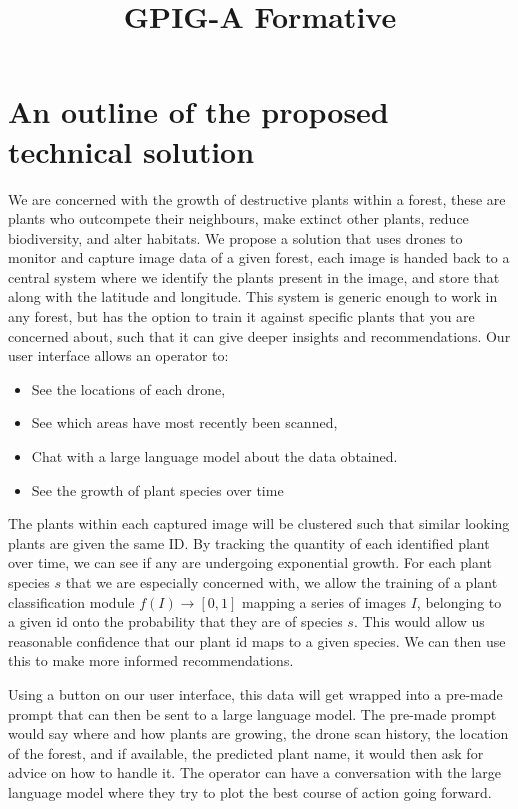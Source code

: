 \documentclass{article}
\title{GPIG-A Formative}
\begin{document}
\maketitle

\section{An outline of the proposed technical solution}

We are concerned with the growth of destructive plants within a forest, these are plants who outcompete their neighbours, make extinct other plants, reduce biodiversity, and alter habitats. 
We propose a solution that uses drones to monitor and capture image data of a given forest, each image is handed back to a central system where we identify the plants present in the image, and store that along with the latitude and longitude.
This system is generic enough to work in any forest, but has the option to train it against specific plants that you are concerned about, such that it can give deeper insights and recommendations.
Our user interface allows an operator to:
\begin{itemize}[noitemsep,topsep=3pt]
\item See the locations of each drone,
\item See which areas have most recently been scanned,
\item Chat with a large language model about the data obtained.
\item See the growth of plant species over time
\end{itemize}


The plants within each captured image will be clustered such that similar looking plants are given the same ID. 
By tracking the quantity of each identified plant over time, we can see if any are undergoing exponential growth.
For each plant species $s$ that we are especially concerned with, we allow the training of a plant classification module $f(I) \rightarrow [0,1]$ mapping a series of images $I$, belonging to a given id onto the probability that they are of species $s$. 
This would allow us reasonable confidence that our plant id maps to a given species.
We can then use this to make more informed recommendations.

Using a button on our user interface, this data will get wrapped into a pre-made prompt that can then be sent to a large language model.
The pre-made prompt would say where and how plants are growing, the drone scan history, the location of the forest, and if available, the predicted plant name, it would then ask for advice on how to handle it.
The operator can have a conversation with the large language model where they try to plot the best course of action going forward.
\end{document}
